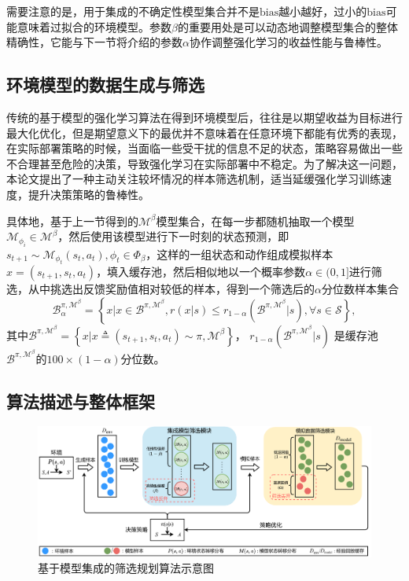 需要注意的是，用于集成的不确定性模型集合并不是$\mathrm{bias}$越小越好，过小的$\mathrm{bias}$可能意味着过拟合的环境模型。参数$\beta$的重要用处是可以动态地调整模型集合的整体精确性，它能与下一节将介绍的参数$\alpha$协作调整强化学习的收益性能与鲁棒性。

\subsection{环境模型的数据生成与筛选}\label{sec:rollout-method}

传统的基于模型的强化学习算法在得到环境模型后，往往是以期望收益为目标进行最大化优化，但是期望意义下的最优并不意味着在任意环境下都能有优秀的表现，在实际部署策略的时候，当面临一些受干扰的信息不足的状态，策略容易做出一些不合理甚至危险的决策，导致强化学习在实际部署中不稳定\cite{zhang2021mbdp}。为了解决这一问题，本论文提出了一种主动关注较坏情况的样本筛选机制，适当延缓强化学习训练速度，提升决策策略的鲁棒性。

具体地，基于上一节得到的$\mathcal{M}^{\beta}$模型集合，在每一步都随机抽取一个模型$\mathcal{M}_{\phi_i}\in\mathcal{M}^\beta$，然后使用该模型进行下一时刻的状态预测，即$s_{t+1}\sim \mathcal{M}_{\phi_t}(s_t,a_t), \phi_t\in\Phi_\beta$，这样的一组状态和动作组成模拟样本$x=\left(s_{t+1},s_t,a_t\right)$，填入缓存池，然后相似地以一个概率参数$\alpha\in(0,1]$进行筛选，从中挑选出反馈奖励值相对较低的样本，得到一个筛选后的$\alpha$分位数样本集合
\begin{equation}\label{def:batch-alpha-beta}
    \mathcal{B}_\alpha^{\pi,\mathcal{M}^\beta}=\left\{x|x\in\mathcal{B}^{\pi,\mathcal{M}^\beta},r(x|s)\leq r_{1-\alpha}(\mathcal{B}^{\pi,\mathcal{M}^\beta}|s), \forall s \in \mathcal{S}\right\},
\end{equation}
其中$\mathcal{B}^{\pi,\mathcal{M}^\beta}=\left\{x|x\triangleq\left(s_{t+1},s_t,a_t\right)\sim\pi,\mathcal{M}^\beta\right\}$， $r_{1-\alpha}(\mathcal{B}^{\pi,\mathcal{M}^\beta}|s)$ 是缓存池 $\mathcal{B}^{\pi,\mathcal{M}^\beta}$的$100\times(1-\alpha)$分位数。

\subsection{算法描述与整体框架}\label{sec:mbdp-description}

\begin{figure}[t]
\centering
\includegraphics[width=\textwidth]{figures/mbdp.pdf}
\caption{基于模型集成的筛选规划算法示意图}
\label{fig:mbdp-structure}
\end{figure}

